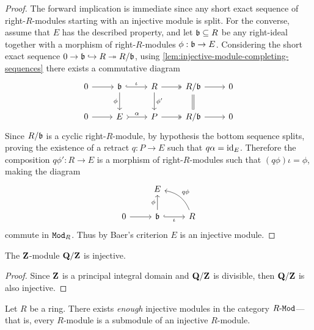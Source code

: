 \begin{proof}
The forward implication is immediate since any short exact sequence of
right-\(R\)-modules starting with an injective module is split. For the
converse, assume that \(E\) has the described property, and let
\(\mathfrak{b} \subseteq R\) be any right-ideal together with a morphism of
right-\(R\)-modules \(\phi: \mathfrak{b} \to E\). Considering the short exact
sequence \(0 \to \mathfrak{b} \hookrightarrow R \twoheadrightarrow R/{\mathfrak{b}}\), using
\cref{lem:injective-module-completing-sequences} there exists a commutative
diagram
\[
\begin{tikzcd}
0 \ar[r]
&\ideal b \ar[r, hook, "\iota"] \ar[d, "\phi"']
&R \ar[r, two heads] \ar[d, "\phi'"]
&R/{\ideal b} \ar[d, equals] \ar[r]
&0
\\
0 \ar[r]
&E \ar[r, tail, "\alpha"]
&P \ar[r, two heads]
&R/{\ideal b} \ar[r]
&0
\end{tikzcd}
\]
Since \(R/{\mathfrak{b}}\) is a cyclic right-\(R\)-module, by hypothesis the bottom
sequence splits, proving the existence of a retract \(q: P \to E\) such that
\(q \alpha = \operatorname{id}_E\). Therefore the composition \(q \phi': R \to E\) is a
morphism of right-\(R\)-modules such that \((q \phi) \iota = \phi\), making the
diagram
\[
\begin{tikzcd}
&E &
\\
0 \ar[r]
&\ideal b \ar[r, hook, "\iota"'] \ar[u, "\phi"]
&R \ar[lu, bend right, "q \phi"']
\end{tikzcd}
\]
commute in \({\texttt{Mod}_{R}}\). Thus by Baer's criterion \(E\) is an injective module.
\end{proof}

\begin{example}
\label{exp:QZ-is-injective-Z-module}
The \(\mathbf{Z}\)-module \(\mathbf{Q}/\mathbf{Z}\) is injective.
\end{example}

\begin{proof}
Since \(\mathbf{Z}\) is a principal integral domain and \(\mathbf{Q}/\mathbf{Z}\) is divisible, then
\(\mathbf{Q}/\mathbf{Z}\) is also injective.
\end{proof}

\begin{theorem}
\label{thm:every-module-submodule-of-injective}
Let \(R\) be a ring. There exists \emph{enough} injective modules in the
category \({R\text{-}\texttt{Mod}}\)---that is, every \(R\)-module is a submodule of an injective
\(R\)-module.
\end{theorem}


